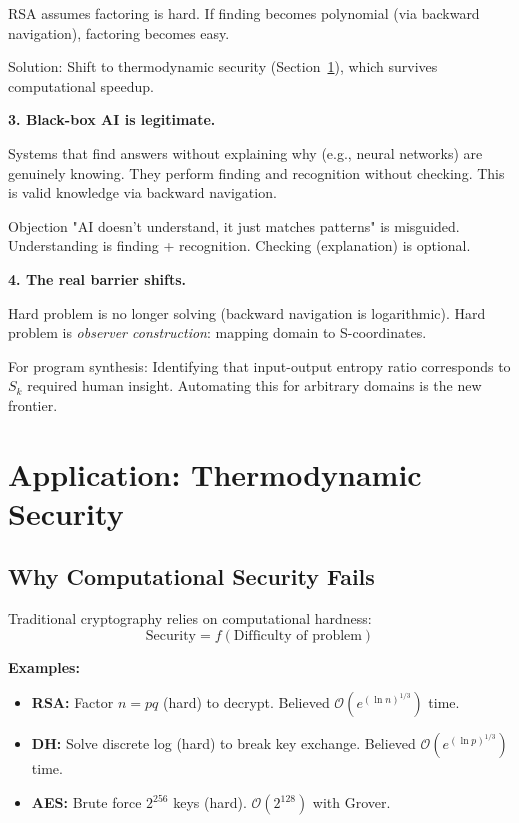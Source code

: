 \documentclass[twocolumn,10pt]{article}
\theoremstyle{definition}
\theoremstyle{remark}
\newcommand{\Sk}{S_k}
\newcommand{\bigO}{\mathcal{O}}
\begin{document}
RSA assumes factoring is hard. If finding becomes polynomial (via backward navigation), factoring becomes easy.

Solution: Shift to thermodynamic security (Section~\ref{sec:security}), which survives computational speedup.

\vspace{0.2cm}
\noindent\textbf{3. Black-box AI is legitimate.}

Systems that find answers without explaining why (e.g., neural networks) are genuinely knowing. They perform finding and recognition without checking. This is valid knowledge via backward navigation.

Objection "AI doesn't understand, it just matches patterns" is misguided. Understanding is finding + recognition. Checking (explanation) is optional.

\vspace{0.2cm}
\noindent\textbf{4. The real barrier shifts.}

Hard problem is no longer solving (backward navigation is logarithmic). Hard problem is \textit{observer construction}: mapping domain to S-coordinates.

For program synthesis: Identifying that input-output entropy ratio corresponds to $\Sk$ required human insight. Automating this for arbitrary domains is the new frontier.

\section{Application: Thermodynamic Security}
\label{sec:security}

\subsection{Why Computational Security Fails}

Traditional cryptography\cite{diffie1976,rivest1978} relies on computational hardness:
\begin{equation}
\text{Security} = f(\text{Difficulty of problem})
\end{equation}

\textbf{Examples:}
\begin{itemize}
\item \textbf{RSA:} Factor $n = pq$ (hard) to decrypt. Believed $\bigO(e^{(\ln n)^{1/3}})$ time\cite{lenstra1993}.
\item \textbf{DH:} Solve discrete log (hard) to break key exchange. Believed $\bigO(e^{(\ln p)^{1/3}})$ time\cite{gordon1993}.
\item \textbf{AES:} Brute force $2^{256}$ keys (hard). $\bigO(2^{128})$ with Grover\cite{grover1996}.
\end{itemize}
\end{document}

